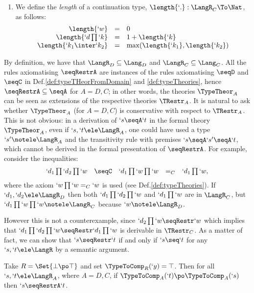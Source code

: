 \documentclass{CSML}
\def\Steffen#1{}\def\Ugo#1{}\def\Franco#1{}
\begin{document}
\begin{defi}
\begin{enumerate}
 \item
We define the \emph{length} of a continuation type, $ \length{`.} : \LangR_C \To \Nat$, as follows:
%
 \[ \begin{array}{rcl}
\length{`w} &=& 0 \\ 
\length{`d\prod `k} &=& 1+ \length{`k} \\ 
\length{`k_1 \inter`k_2} &=& \max (\length{`k_1} , \length{`k_2})
 \end{array} \]
 \Ugo{Where length is used? I have put this part into comment}
\Steffen{In Theorem {thm:typableAreSN}; a simple find reveals this.}
 \end{enumerate}
 \end{defi}

By definition, we have that $\LangR_D \subseteq \Lang_D$ and $\LangR_C \subseteq \Lang_C$. 
All the rules axiomatising $\seqRestrA$ are instances of the rules axiomatising $\seqD$ and $\seqC$ in Def.\skp\ref{def:typeTHeorFromDomain} and \ref{def:typeTheories}, 
hence ${\seqRestrA} \subseteq {\seqA}$ for $A=D,C$; in other words, the theories $\TypeTheor_A$ can be seen as extensions of the respective theories $\TRestr_A$. 
It is natural to ask whether $\TypeTheor_A$ (for $A=D,C$) is conservative with respect to $\TRestr_A$.
This is not obvious: in a derivation of $`s \seqA `t$ in the formal theory $\TypeTheor_A$, even if $`s,`t \ele \LangR_A$, one could have used a type $`s'\notele \LangR_A$ and the transitivity rule with premises $`s\seqA`s'\seqA`t$, which cannot be derived in the formal presentation of $\seqRestrA$.
For example, consider the inequalities:
%
 \[ \begin{array}{rcl@{\quad}lc}
`d_1\prod `d_2\prod `w &\seqC& `d_1\prod `w\prod `w &=_C& `d_1\prod `w,
 \end{array} \]
where the axiom $`w\prod `w =_C `w$ is used (see Def.\skp\ref{def:typeTheories}).
If $`d_1,`d_2 \ele \LangR_D$ then both $`d_1\prod `d_2\prod `w$ and $`d_1\prod `w$ are in $\LangR_C$, but $ `d_1\prod `w\prod `w\notele \LangR_C$ because $`w\notele \LangR_D$. 

However this is not a counterexample, since $`d_2\prod `w\seqRestr `w$ which implies that $`d_1\prod `d_2\prod `w\seqRestr `d_1\prod `w$ is derivable in $\TRestr_C$.
As a matter of fact, we can show that $`s \seqRestr `t$ if and only if $`s \seq `t$ for any $`s,`t \ele \LangR$ by a semantic argument. 

 \begin{lem} \label{lem:pre-order-restriction}
Take $R = \Set{\bot \po \top}$ and set $\TypeToComp_R(`y) = \top$.
Then for all $`s,`t \ele \LangR_A$, where $A=D,C$, if $\TypeToComp_A(`t) \po \TypeToComp_A(`s)$ then $`s \seqRestrA `t$.
 \end{lem}
\end{document}
